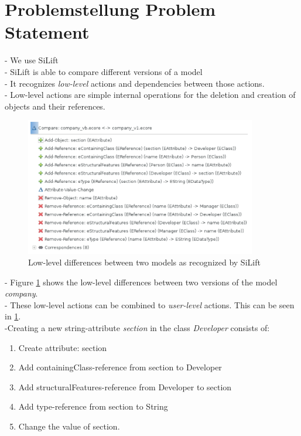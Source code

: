 \documentclass[10pt,a4paper,oneside]{scrartcl}
\begin{document}
\section{
	{Problemstellung}
	{Problem Statement}}
\label{sec:problem_statement}

- We use SiLift
\\
- SiLift is able to compare different versions of a model
\\
- It recognizes \textit{low-level} actions and dependencies between those actions.
\\
- Low-level actions are simple internal operations for the deletion and creation of objects and their references.
\\
\begin{figure}
	\centering
	\includegraphics[width=0.9\textwidth]{./res/low-level-actions.png}
	\caption{Low-level differences between two models as recognized by SiLift}
	\label{fig:SiLiftEx}
\end{figure}
- Figure \ref{fig:SiLiftEx} shows the low-level differences between two versions of the model \textit{company}.
\\
- These low-level actions can be combined to \textit{user-level} actions. This can be seen in \ref{fig:SiLiftEx}.
\\
-Creating a new string-attribute \textit{section} in the class \textit{Developer} consists of:
\begin{enumerate}
	\item Create attribute: section
	\item Add containingClass-reference from section to Developer
	\item Add structuralFeatures-reference from Developer to section
	\item Add type-reference from section to String
	\item Change the value of section.
\end{enumerate}
\end{document}

